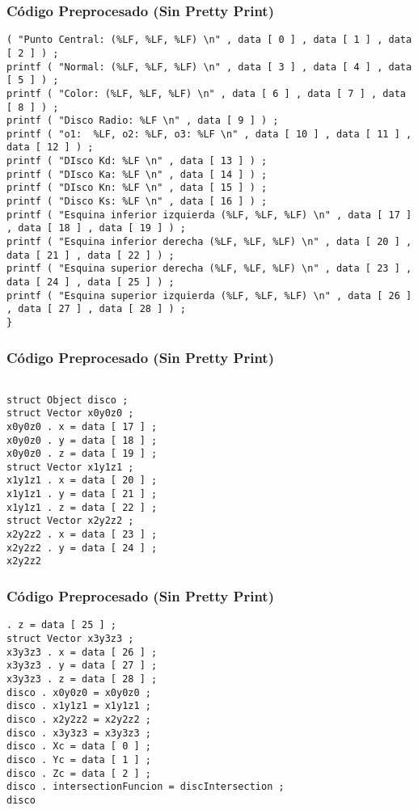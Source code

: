 \documentclass{beamer}
\begin{document}
\begin{frame}[fragile]
\frametitle{C\'odigo Preprocesado (Sin Pretty Print)}
\begin{lstlisting}[style=CStyle]
( "Punto Central: (%LF, %LF, %LF) \n" , data [ 0 ] , data [ 1 ] , data [ 2 ] ) ; 
printf ( "Normal: (%LF, %LF, %LF) \n" , data [ 3 ] , data [ 4 ] , data [ 5 ] ) ; 
printf ( "Color: (%LF, %LF, %LF) \n" , data [ 6 ] , data [ 7 ] , data [ 8 ] ) ; 
printf ( "Disco Radio: %LF \n" , data [ 9 ] ) ; 
printf ( "o1:  %LF, o2: %LF, o3: %LF \n" , data [ 10 ] , data [ 11 ] , data [ 12 ] ) ; 
printf ( "DIsco Kd: %LF \n" , data [ 13 ] ) ; 
printf ( "DIsco Ka: %LF \n" , data [ 14 ] ) ; 
printf ( "DIsco Kn: %LF \n" , data [ 15 ] ) ; 
printf ( "Disco Ks: %LF \n" , data [ 16 ] ) ; 
printf ( "Esquina inferior izquierda (%LF, %LF, %LF) \n" , data [ 17 ] , data [ 18 ] , data [ 19 ] ) ; 
printf ( "Esquina inferior derecha (%LF, %LF, %LF) \n" , data [ 20 ] , data [ 21 ] , data [ 22 ] ) ; 
printf ( "Esquina superior derecha (%LF, %LF, %LF) \n" , data [ 23 ] , data [ 24 ] , data [ 25 ] ) ; 
printf ( "Esquina superior izquierda (%LF, %LF, %LF) \n" , data [ 26 ] , data [ 27 ] , data [ 28 ] ) ; 
} \end{lstlisting}
\end{frame}
\begin{frame}[fragile]
\frametitle{C\'odigo Preprocesado (Sin Pretty Print)}
\begin{lstlisting}[style=CStyle]

struct Object disco ; 
struct Vector x0y0z0 ; 
x0y0z0 . x = data [ 17 ] ; 
x0y0z0 . y = data [ 18 ] ; 
x0y0z0 . z = data [ 19 ] ; 
struct Vector x1y1z1 ; 
x1y1z1 . x = data [ 20 ] ; 
x1y1z1 . y = data [ 21 ] ; 
x1y1z1 . z = data [ 22 ] ; 
struct Vector x2y2z2 ; 
x2y2z2 . x = data [ 23 ] ; 
x2y2z2 . y = data [ 24 ] ; 
x2y2z2 \end{lstlisting}
\end{frame}
\begin{frame}[fragile]
\frametitle{C\'odigo Preprocesado (Sin Pretty Print)}
\begin{lstlisting}[style=CStyle]
. z = data [ 25 ] ; 
struct Vector x3y3z3 ; 
x3y3z3 . x = data [ 26 ] ; 
x3y3z3 . y = data [ 27 ] ; 
x3y3z3 . z = data [ 28 ] ; 
disco . x0y0z0 = x0y0z0 ; 
disco . x1y1z1 = x1y1z1 ; 
disco . x2y2z2 = x2y2z2 ; 
disco . x3y3z3 = x3y3z3 ; 
disco . Xc = data [ 0 ] ; 
disco . Yc = data [ 1 ] ; 
disco . Zc = data [ 2 ] ; 
disco . intersectionFuncion = discIntersection ; 
disco \end{lstlisting}
\end{frame}
\end{document}
